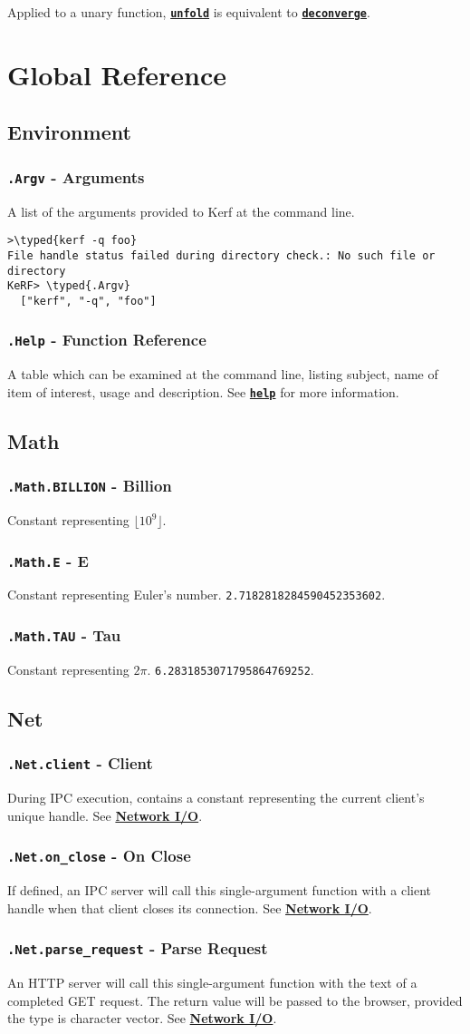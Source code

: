 \documentclass{article}
\newcommand{\typed}[1]{\textcolor{TealBlue}{#1}}
\newcommand{\primu}[2]{\hyperref[prim:#2]{\textbf{\texttt{#1}}}}
\newcommand{\prim}[1]{\primu{#1}{#1}}
\newcommand{\comb}[1]{\primu{#1}{#1}}
\newcommand{\constdef}[3]{\subsubsection{\texttt{#1} - #2}\label{const:#3}}
\begin{document}
Applied to a unary function, \comb{unfold} is equivalent to \comb{deconverge}.

\pagebreak
\section {Global Reference}

\subsection{Environment}

\constdef{.Argv}{Arguments}{argv}
A list of the arguments provided to Kerf at the command line.
\begin{Verbatim}
>\typed{kerf -q foo}
File handle status failed during directory check.: No such file or directory
KeRF> \typed{.Argv}
  ["kerf", "-q", "foo"]
\end{Verbatim}

\constdef{.Help}{Function Reference}{help}
A table which can be examined at the command line, listing subject, name of item of interest, usage and description.  See \prim{help} for more information.

\subsection{Math}

\constdef{.Math.BILLION}{Billion}{mathBillion}
Constant representing $\lfloor 10^9 \rfloor$.

\constdef{.Math.E}{E}{mathE}
Constant representing Euler's number. \texttt{2.7182818284590452353602}.

\constdef{.Math.TAU}{Tau}{mathTau}
Constant representing $2\pi$. \texttt{6.2831853071795864769252}.

\subsection{Net}
\constdef{.Net.client}{Client}{netClient}
During IPC execution, contains a constant representing the current client's unique handle. See \hyperref[sec:netio]{\textbf{Network I/O}}.

\constdef{.Net.on\_close}{On Close}{netOnClose}
If defined, an IPC server will call this single-argument function with a client handle when that client closes its connection. See \hyperref[sec:netio]{\textbf{Network I/O}}.

\constdef{.Net.parse\_request}{Parse Request}{netParseRequest}
An HTTP server will call this single-argument function with the text of a completed GET request. The return value will be passed to the browser, provided the type is character vector. See \hyperref[sec:netio]{\textbf{Network I/O}}.
\end{document}
